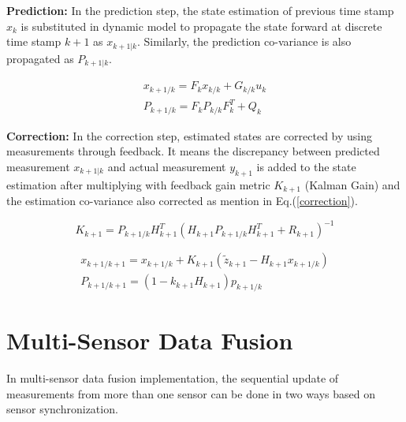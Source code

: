 \textbf{Prediction:}
In the prediction step, the state estimation of previous time stamp $x_{k}$ is substituted in dynamic model to propagate the state forward at discrete time stamp $k+1$ as $x_{k+1|k}$. Similarly, the prediction co-variance is also propagated as $P_{k+1|k}$. 

\begin{equation}
\begin{array}{l}
x_{k+1 / k}=F_{k} x_{k / k}+G_{k / k} u_{k} \\
P_{k+1 / k}=F_{k} P_{k / k} F_{k}^{T}+Q_{k}
\end{array}
\end{equation}

\textbf{Correction:}
In the correction step, estimated states are corrected by using measurements through feedback. It means the discrepancy between predicted measurement $x_{k+1|k}$ and actual measurement $y_{k+1}$ is added to the state estimation after multiplying with feedback gain metric $K_{k+1}$ (Kalman Gain) and the estimation co-variance also corrected as mention in Eq.(\ref{correction}).

\begin{equation}
K_{k+1}=P_{k+1 / k} H_{k+1}^{T}\left(H_{k+1} P_{k+1 / k} H_{k+1}^{T}+R_{k+1}\right)^{-1}
\end{equation}

\begin{equation}
\label{correction}
\begin{array}{l}
x_{k+1 / k+1}=x_{k+1 / k}+K_{k+1}\left(\tilde{z}_{k+1}-H_{k+1} x_{k+1 / k}\right) \\
P_{k+1 / k+1}=\left(1-k_{k+1} H_{k+1}\right) p_{k+1 / k}
\end{array}
\end{equation}

\section{Multi-Sensor Data Fusion}
In multi-sensor data fusion implementation, the sequential update of measurements from more than one sensor can be done in two ways based on sensor synchronization.  

